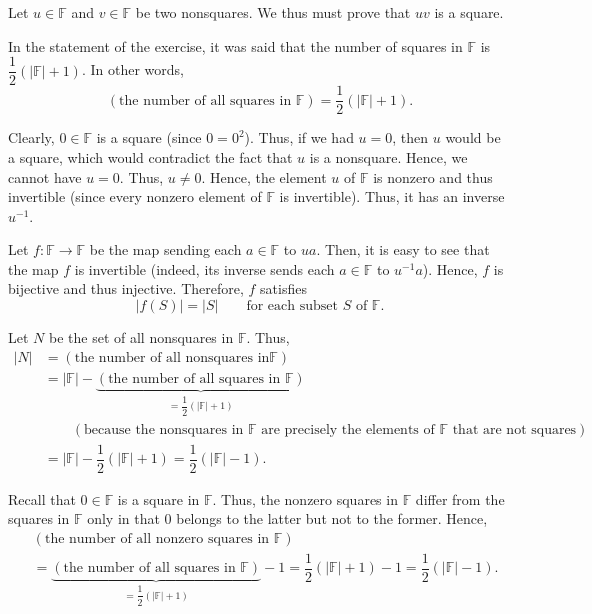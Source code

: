 \documentclass[paper=a4, fontsize=12pt]{scrartcl}%
\theoremstyle{plainsl}
\theoremstyle{definition}
\theoremstyle{remark}
\begin{document}
Let $u\in\mathbb{F}$ and $v\in\mathbb{F}$ be two nonsquares. We thus must
prove that $uv$ is a square.

In the statement of the exercise, it was said that the number of squares in
$\mathbb{F}$ is $\dfrac{1}{2}\left(  \left\vert \mathbb{F}\right\vert
+1\right)  $. In other words,
\[
\left(  \text{the number of all squares in }\mathbb{F}\right)  = \dfrac{1}%
{2}\left(  \left\vert \mathbb{F}\right\vert +1\right)  .
\]


Clearly, $0\in\mathbb{F}$ is a square (since $0=0^{2}$). Thus, if we had
$u=0$, then $u$ would be a square, which would contradict the fact that $u$ is
a nonsquare. Hence, we cannot have $u=0$. Thus, $u\neq0$. Hence, the element
$u$ of $\mathbb{F}$ is nonzero and thus invertible (since every nonzero
element of $\mathbb{F}$ is invertible). Thus, it has an inverse $u^{-1}$.

Let $f:\mathbb{F}\rightarrow\mathbb{F}$ be the map sending each $a\in
\mathbb{F}$ to $ua$. Then, it is easy to see that the map $f$ is invertible
(indeed, its inverse sends each $a\in\mathbb{F}$ to $u^{-1}a$). Hence, $f$ is
bijective and thus injective. Therefore, $f$ satisfies%
\begin{equation}
\left\vert f\left(  S\right)  \right\vert =\left\vert S\right\vert
\qquad\text{for each subset }S\text{ of }\mathbb{F}.
\label{sol.finfield.squares2.c.1}%
\end{equation}


Let $N$ be the set of all nonsquares in $\mathbb{F}$. Thus,%
\begin{align*}
\left\vert N\right\vert  &  =\left(  \text{the number of all nonsquares in
}\mathbb{F}\right) \\
&  =\left\vert \mathbb{F}\right\vert -\underbrace{\left(  \text{the number of
all squares in }\mathbb{F}\right)  }_{=\dfrac{1}{2}\left(  \left\vert
\mathbb{F}\right\vert +1\right)  }\\
&  \qquad\left(  \text{because the nonsquares in }\mathbb{F}\text{ are
precisely the elements of }\mathbb{F}\text{ that are not squares}\right) \\
&  =\left\vert \mathbb{F}\right\vert -\dfrac{1}{2}\left(  \left\vert
\mathbb{F}\right\vert +1\right)  =\dfrac{1}{2}\left(  \left\vert
\mathbb{F}\right\vert -1\right)  .
\end{align*}


Recall that $0 \in\mathbb{F}$ is a square in $\mathbb{F}$. Thus, the nonzero
squares in $\mathbb{F}$ differ from the squares in $\mathbb{F}$ only in that
$0$ belongs to the latter but not to the former. Hence,
\begin{align*}
&  \left(  \text{the number of all nonzero squares in } \mathbb{F} \right) \\
&  = \underbrace{\left(  \text{the number of all squares in } \mathbb{F}
\right)  }_{= \dfrac{1}{2}\left(  \left|  \mathbb{F} \right|  +1 \right)  } -
1 = \dfrac{1}{2}\left(  \left|  \mathbb{F} \right|  +1 \right)  - 1 =
\dfrac{1}{2}\left(  \left|  \mathbb{F} \right|  -1 \right)  .
\end{align*}
\end{document}
